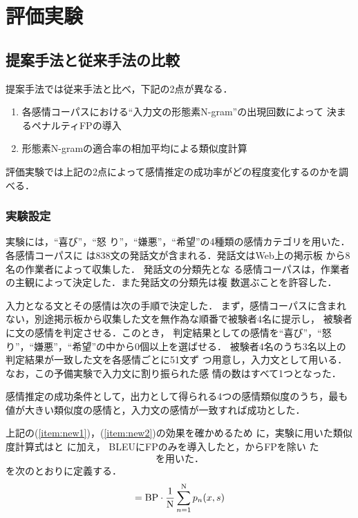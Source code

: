 \documentclass[japanese]{jnlp_1.4}
\def\resp#1{}
\def\respeqn#1{}
\begin{document}
\section{評価実験}
\label{sec:ev}

\subsection{提案手法と従来手法の比較}
\label{sec:comp_es_bleu}

提案手法では従来手法と比べ，下記の2点が異なる．
\begin{enumerate}
 \item 各感情コーパスにおける``入力文の形態素N-gram''の出現回数によって
       決まるペナルティFPの導入 \label{item:new1}
 \item 形態素N-gramの適合率の相加平均による類似度計算 \label{item:new2}
\end{enumerate}
評価実験では上記の2点によって感情推定の成功率がどの程度変化するのかを調
べる．


\subsubsection{実験設定}

実験には，\resp{基本的な感情であり，収集したコーパス中に比較的頻出
した}``喜び''，``怒
り''，``嫌悪''，``希望''の4種類の感情カテゴリを用いた．各感情コーパスに
は838文の発話文が含まれる．発話文はWeb上の掲示板
から8名の作業者によって収集した．
発話文の分類先とな
る感情コーパスは，作業者の主観によって決定した．また発話文の分類先は複
数選ぶことを許容した．

入力となる文とその感情は次の手順で決定した．
まず，感情コーパスに含まれない，別途掲示板から収集した文を無作為な順番で被験者4名に提示し，
被験者に文の感情を判定させる．このとき，
判定結果としての感情を``喜び''，``怒り''，``嫌悪''，``希望''の中から0個以上を選ばせる．
被験者4名のうち3名以上の判定結果が一致した文を各感情ごとに51文ず
つ用意し，入力文として用いる．なお，この予備実験で入力文に割り振られた感
情の数はすべて1つとなった．

感情推定の成功条件として，出力として得られる4つの感情類似度のうち，最も
値が大きい類似度の感情と，入力文の感情が一致すれば成功とした．

上記の(\ref{item:new1})，(\ref{item:new2})の効果を確かめるため
に，実験に用いた類似度計算式は\resp{三品らの方法（式 ({\ref{eq:bleu}})）}と
\resp{RECARE（式({\ref{eq:recare}})）}に加え，
BLEUにFPのみを導入した\resp{{$sim_{\rm BLEUFP^{+}}$}（式({\ref{eq:bleu_with_fp_pi}})）}と，\respeqn{RECARE}からFPを除い
た$\respeqn{sim_{\rm RECAREFP^{-}}}$を用いた．$\respeqn{sim_{\rm RECAREFP^{-}}}$を次のとおりに定義する．
\begin{equation}
 \respeqn{sim_{\rm RECAREFP^{-}}(x,s)} = {\rm BP} \cdot \frac{1}{\rm N}\sum^{\rm N}_{n=1}
 p_{n}(x,s) \label{eq:es_without_fp}
\end{equation}
\end{document}
